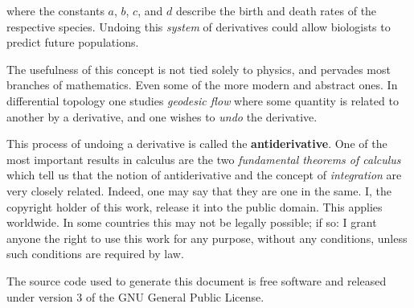 \documentclass{article}
\begin{document}
    where the constants $a$, $b$, $c$, and $d$ describe the birth and death
    rates of the respective species. Undoing this \textit{system} of
    derivatives could allow biologists to predict future populations.
    \par\hfill\par
    The usefulness of this concept is not tied solely to physics,
    and pervades most branches of mathematics.
    Even some of the more modern and abstract ones.
    In differential topology
    one studies \textit{geodesic flow} where some quantity is related to
    another by a derivative, and one wishes to \textit{undo} the derivative.
    \par\hfill\par
    This process of undoing a derivative is called the
    \textbf{antiderivative}. One of the most important results in calculus are
    the two \textit{fundamental theorems of calculus} which tell us that the
    notion of antiderivative and the concept of \textit{integration} are very
    closely related. Indeed, one may say that they are one in the same.
\ifx\noPreamble\undefined
    \newpage
    I, the copyright holder of this work, release it into the public domain.
    This applies worldwide. In some countries this may not be legally possible;
    if so: I grant anyone the right to use this work for any purpose, without
    any conditions, unless such conditions are required by law.
    \par\hfill\par
    The source code used to generate this document is free software and released
    under version 3 of the GNU General Public License.
\end{document}
